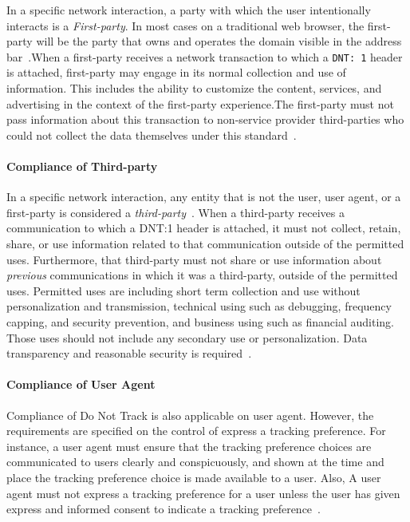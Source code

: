 \documentclass{sig-alternate}
\begin{document}
In a specific network interaction, a party with which the user intentionally interacts is a \emph{First-party}. In most cases on a traditional web browser, the first-party will be the party that owns and operates the domain visible in the address bar~\cite{w3ctrackingcompliance}.When a first-party receives a network transaction to which a \verb|DNT: 1| header is attached, first-party may engage in its normal collection and use of information. This includes the ability to customize the content, services, and advertising in the context of the first-party experience.The first-party must not pass information about this transaction to non-service provider third-parties who could not collect the data themselves under this standard~\cite{w3ctrackingcompliance}.

\paragraph{Compliance of Third-party}

In a specific network interaction, any entity that is not the user, user agent, or a first-party is considered a \emph{third-party}~\cite{w3ctrackingcompliance}. When a third-party receives a communication to which a DNT:1 header is attached, it must not collect, retain, share, or use information related to that communication outside of the permitted uses. Furthermore, that third-party must not share or use information about \emph{previous} communications in which it was a third-party, outside of the permitted uses. Permitted uses are including short term collection and use without personalization and transmission, technical using such as debugging, frequency capping, and security prevention, and business using such as financial auditing. Those uses should not include any secondary use or personalization. Data transparency and reasonable security is required~\cite{w3ctrackingcompliance}.

\paragraph{Compliance of User Agent}

Compliance of Do Not Track is also applicable on user agent. However, the requirements are specified on the control of express a tracking preference. For instance, a user agent must ensure that the tracking preference choices are communicated to users clearly and conspicuously, and shown at the time and place the tracking preference choice is made available to a user. Also, A user agent must not express a tracking preference for a user unless the user has given express and informed consent to indicate a tracking preference~\cite{w3ctrackingcompliance}.
\end{document}
